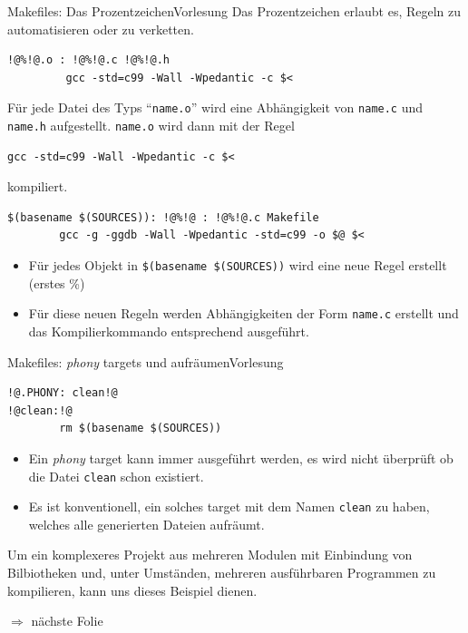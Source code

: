 \documentclass[xcolor=dvipsnames]{beamer}
\newcounter{lecturecounter}
\begin{document}
\begin{frame}[fragile]{Makefiles: Das Prozentzeichen}{Vorlesung }
Das Prozentzeichen erlaubt es, Regeln zu automatisieren oder zu verketten.
\begin{block}{}
\begin{lstlisting}[basicstyle=\ttfamily\scriptsize]
!@%!@.o : !@%!@.c !@%!@.h
         gcc -std=c99 -Wall -Wpedantic -c $<
\end{lstlisting}
Für jede Datei des Typs ``\verb|name.o|'' wird eine Abhängigkeit von \verb|name.c| und \verb|name.h| aufgestellt. \verb|name.o| wird dann mit der Regel
\begin{verbatim}
gcc -std=c99 -Wall -Wpedantic -c $<
\end{verbatim}
kompiliert.
\end{block}
\begin{block}{}
\begin{lstlisting}
$(basename $(SOURCES)): !@%!@ : !@%!@.c Makefile
        gcc -g -ggdb -Wall -Wpedantic -std=c99 -o $@ $<
\end{lstlisting}
\begin{itemize}
  \item{Für jedes Objekt in \verb|$(basename $(SOURCES))| wird eine neue Regel erstellt (erstes \%)}
  \item{Für diese neuen Regeln werden Abhängigkeiten der Form \verb|name.c| erstellt und das Kompilierkommando entsprechend ausgeführt.}
\end{itemize}
\end{block}
\end{frame}

\begin{frame}[fragile]{Makefiles: \emph{phony} targets und aufräumen}{Vorlesung }
\begin{lstlisting}[basicstyle=\ttfamily\scriptsize]
!@.PHONY: clean!@
!@clean:!@
        rm $(basename $(SOURCES))
\end{lstlisting}
\begin{block}{}
  \begin{itemize}
    \item{Ein \emph{phony} target kann immer ausgeführt werden, es wird nicht überprüft ob die Datei \texttt{clean} schon existiert.}
    \item{Es ist konventionell, ein solches target mit dem Namen \verb|clean| zu haben, welches alle generierten Dateien aufräumt.}
  \end{itemize}
\end{block}
\begin{block}{}
  Um ein komplexeres Projekt aus mehreren Modulen mit Einbindung von Bilbiotheken und, unter Umständen, mehreren ausführbaren Programmen zu kompilieren, kann uns dieses Beispiel dienen.
\end{block}
$\Rightarrow$ nächste Folie
\end{frame}
\end{document}
